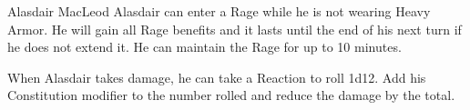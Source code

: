 \begin{DndMonster}[width=0.5\textwidth]{Alasdair MacLeod}
	Alasdair can enter a Rage while he is not wearing Heavy Armor. He will gain all Rage benefits and it lasts until the end of his next turn if he does not extend it. He can maintain the Rage for up to 10 minutes.
	
    When Alasdair takes damage, he can take a Reaction to roll 1d12. Add his Constitution modifier to the number rolled and reduce the damage by the total.
\end{DndMonster}